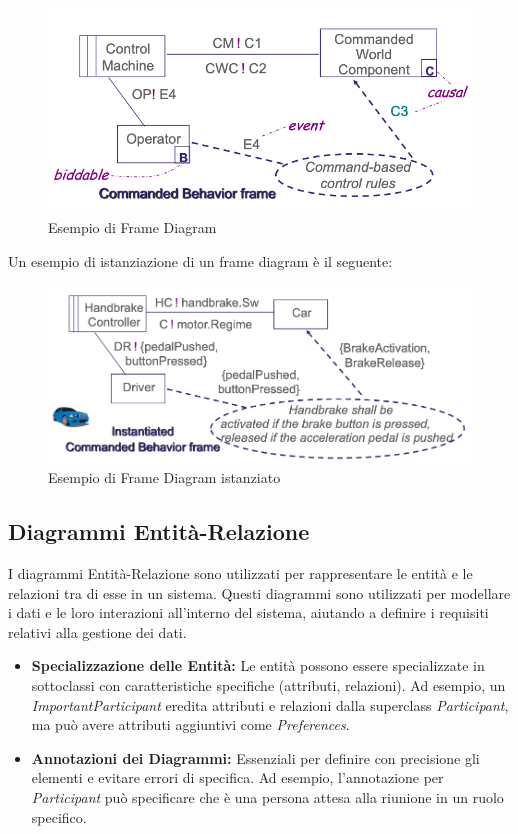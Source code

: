 \begin{figure}[H]
    \centering
    \includegraphics[scale=0.4]{img/frame.png}
    \caption{Esempio di Frame Diagram}
\end{figure}
Un esempio di istanziazione di un frame diagram è il seguente:
\begin{figure}[H]
    \centering
    \includegraphics[scale=0.4]{img/instace_frame.png}
    \caption{Esempio di Frame Diagram istanziato}
\end{figure}
\subsection{Diagrammi Entità-Relazione}
I diagrammi Entità-Relazione sono utilizzati per rappresentare le entità e le
relazioni tra di esse in un sistema. Questi diagrammi sono utilizzati per modellare
i dati e le loro interazioni all'interno del sistema, aiutando a definire i requisiti
relativi alla gestione dei dati.

\begin{itemize}
    \item \textbf{Specializzazione delle Entità:} Le entità possono essere
    specializzate in sottoclassi con caratteristiche specifiche (attributi, relazioni).
    Ad esempio, un \textit{ImportantParticipant} eredita attributi e relazioni dalla
    superclass \textit{Participant}, ma può avere attributi aggiuntivi come \textit{Preferences}.
    \item \textbf{Annotazioni dei Diagrammi:} Essenziali per definire con precisione
    gli elementi e evitare errori di specifica. Ad esempio, l'annotazione per
    \textit{Participant} può specificare che è una persona attesa alla riunione in
    un ruolo specifico.
\end{itemize}

